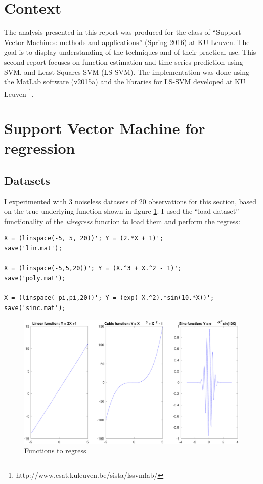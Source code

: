 \documentclass[11pt, a4paper]{article}
\begin{document}

\tableofcontents
\newpage

\section*{Context}

The analysis presented in this report was produced for the class of
``Support Vector Machines: methods and applications'' (Spring 2016) at
KU Leuven. The goal is to display understanding of the techniques and
of their practical use. This second report focuses on function
estimation and time series prediction using SVM, and Least-Squares SVM
(LS-SVM). The implementation was done using the MatLab software
(v2015a) and the libraries for LS-SVM developed at KU Leuven
\footnote{http://www.esat.kuleuven.be/sista/lssvmlab/}.

\section{Support Vector Machine for regression}

\subsection{Datasets}
I experimented with 3 noiseless datasets of 20 observations for this
section, based on the true underlying function shown in figure
\ref{fig:regress_datasets}. I used the ``load dataset'' functionality
of the \emph{uiregress} function to load them and perform the regress:

\begin{lstlisting}
X = (linspace(-5, 5, 20))'; Y = (2.*X + 1)';
save('lin.mat');

X = (linspace(-5,5,20))'; Y = (X.^3 + X.^2 - 1)';
save('poly.mat');

X = (linspace(-pi,pi,20))'; Y = (exp(-X.^2).*sin(10.*X))';
save('sinc.mat');
\end{lstlisting}

\begin{figure}[H]
    \centering
    \includegraphics[scale=.30]{datasets.pdf}
    \caption{Functions to regress}
    \label{fig:regress_datasets}
\end{figure}
\end{document}
